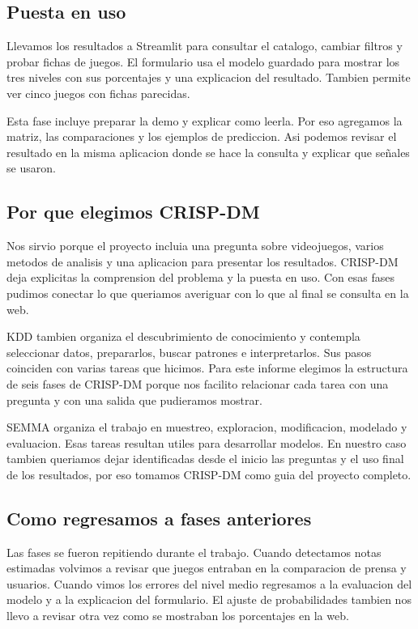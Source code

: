 \documentclass[letterpaper,11pt]{article}
\begin{document}
\subsection{Puesta en uso}
Llevamos los resultados a Streamlit para consultar el catalogo, cambiar filtros y probar fichas de juegos. El formulario usa el modelo guardado para mostrar los tres niveles con sus porcentajes y una explicacion del resultado. Tambien permite ver cinco juegos con fichas parecidas.

Esta fase incluye preparar la demo y explicar como leerla. Por eso agregamos la matriz, las comparaciones y los ejemplos de prediccion. Asi podemos revisar el resultado en la misma aplicacion donde se hace la consulta y explicar que señales se usaron.

\subsection{Por que elegimos CRISP-DM}
Nos sirvio porque el proyecto incluia una pregunta sobre videojuegos, varios metodos de analisis y una aplicacion para presentar los resultados. CRISP-DM deja explicitas la comprension del problema y la puesta en uso. Con esas fases pudimos conectar lo que queriamos averiguar con lo que al final se consulta en la web.

KDD tambien organiza el descubrimiento de conocimiento y contempla seleccionar datos, prepararlos, buscar patrones e interpretarlos. Sus pasos coinciden con varias tareas que hicimos. Para este informe elegimos la estructura de seis fases de CRISP-DM porque nos facilito relacionar cada tarea con una pregunta y con una salida que pudieramos mostrar.

SEMMA organiza el trabajo en muestreo, exploracion, modificacion, modelado y evaluacion. Esas tareas resultan utiles para desarrollar modelos. En nuestro caso tambien queriamos dejar identificadas desde el inicio las preguntas y el uso final de los resultados, por eso tomamos CRISP-DM como guia del proyecto completo.

\subsection{Como regresamos a fases anteriores}
Las fases se fueron repitiendo durante el trabajo. Cuando detectamos notas estimadas volvimos a revisar que juegos entraban en la comparacion de prensa y usuarios. Cuando vimos los errores del nivel medio regresamos a la evaluacion del modelo y a la explicacion del formulario. El ajuste de probabilidades tambien nos llevo a revisar otra vez como se mostraban los porcentajes en la web.
\end{document}
